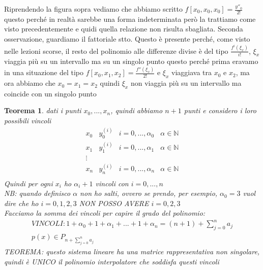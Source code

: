 \documentclass[a4paper, portrait]{book}
\numberwithin{equation}{chapter} %
\newtheorem{theorem}{Teorema}
\begin{document}
Riprendendo la figura sopra vediamo che abbiamo scritto $f[x_0,x_0,x_0] = \frac{y''_0}{2!}$ questo perché in realtà sarebbe una forma indeterminata però la trattiamo come visto precedentemente e quidi quella relazione non risulta sbagliata. Seconda osservazione, guardiamo il fattoriale stto. Questo è presente perché, come visto nelle lezioni scorse, il resto del polinomio alle differenze divise è del tipo $\frac{f^i(\xi_x)}{i!}$, $\xi_x$ viaggia più su un intervallo ma su un singolo punto questo perché prima eravamo in una situazione del tipo $f[x_0,x_1,x_2] = \frac{f''(\xi_x)}{2!}$ e $\xi_x$ viaggiava tra $x_0$ e $x_2$, ma ora abbiamo che $x_0 = x_1 = x_2$ quindi $\xi_x$ non viaggia più su un intervallo ma coincide con un singolo punto
\begin{theorem}
    dati i punti $x_0,...,x_n$, quindi abbiamo $n+1$ punti e considero i loro possibili vincoli
    \begin{equation}
        \begin{matrix}
            x_0&y_0^{(i)}&i = 0,...,\alpha_0&\alpha \in \mathbb{N}\\
            x_1&y_1^{(i)}&i = 0,...,\alpha_1&\alpha \in \mathbb{N}\\
            \vdots\\
            x_n&y_n^{(i)}&i = 0,...,\alpha_n&\alpha \in \mathbb{N}\\
        \end{matrix}
    \end{equation}
    Quindi per ogni $x_i$ ho $\alpha_i + 1$ vincoli con $i = 0,...,n$\\
    NB: quando definisco $\alpha$ non ho salti, ovvero se prendo, per esempio, $\alpha_0 = 3$ vuol dire che ho $i = 0,1,2,3$ NON POSSO AVERE $i = 0,2,3$\\
    Facciamo la somma dei vincoli per capire il grado del polinomio:
    \begin{gather}
        VINCOLI: 1 + \alpha_0 + 1 + \alpha_1 + ... + 1 + \alpha_n = (n+1)+\sum_{j = 0}^{n} a_j\\
        p(x) \in P_{n+\sum^{n}_{j=0}a_j}
    \end{gather}
    TEOREMA: questo sistema lineare ha una matrice rappresentativa non singolare, quindi è UNICO il polinomio interpolatore che soddisfa questi vincoli
\end{theorem}
\end{document}
